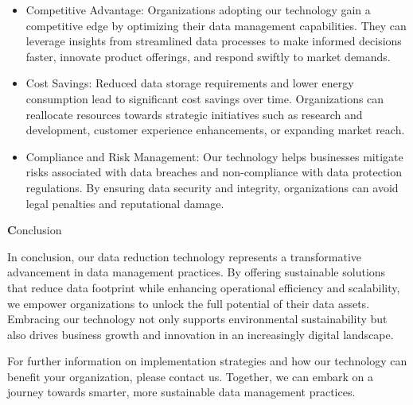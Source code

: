 \begin{itemize}
\item Competitive Advantage: Organizations adopting our technology gain a competitive edge by optimizing their data management capabilities. They can leverage insights from streamlined data processes to make informed decisions faster, innovate product offerings, and respond swiftly to market demands.
\item Cost Savings: Reduced data storage requirements and lower energy consumption lead to significant cost savings over time. Organizations can reallocate resources towards strategic initiatives such as research and development, customer experience enhancements, or expanding market reach.
\item Compliance and Risk Management: Our technology helps businesses mitigate risks associated with data breaches and non-compliance with data protection regulations. By ensuring data security and integrity, organizations can avoid legal penalties and reputational damage.

\end{itemize}

{\textbf Conclusion}

In conclusion, our data reduction technology represents a transformative advancement in data management practices. By offering sustainable solutions that reduce data footprint while enhancing operational efficiency and scalability, we empower organizations to unlock the full potential of their data assets. Embracing our technology not only supports environmental sustainability but also drives business growth and innovation in an increasingly digital landscape.

For further information on implementation strategies and how our technology can benefit your organization, please contact us. Together, we can embark on a journey towards smarter, more sustainable data management practices.
